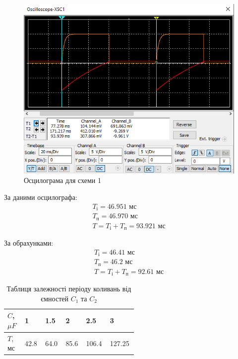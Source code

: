 \documentclass{article}
\begin{document}
\begin{normalsize}
	\begin{figure}[H]
		\centering
		\includegraphics[width=\textwidth]{2}
		\caption{Осцилограма для схеми 1}
	\end{figure}

	\begin{multicols}{2}
		За даними осцилографа:
		\begin{gather}
			T_{\text{і}}=46.951\text{ мс}\nonumber\\
			T_{\text{п}}=46.970\text{ мс}\nonumber\\
			T=T_{\text{і}}+T_{\text{п}}=93.921\text{ мс}\nonumber
		\end{gather}
		
		\columnbreak
		
		За обрахунками:
		\begin{gather}
			T_{\text{і}}=46.41\text{ мс}\nonumber\\
			T_{\text{п}}=46.2\text{ мс}\nonumber\\
			T=T_{\text{і}}+T_{\text{п}}=92.61\text{ мс}\nonumber
		\end{gather}
	\end{multicols}

	\begin{table}[H]
		\centering
		\renewcommand*\arraystretch{1.3}
		\begin{tabular}{|p{0.12\linewidth}|p{0.08\linewidth}|p{0.08\linewidth}|p{0.08\linewidth}|p{0.08\linewidth}|p{0.08\linewidth}|}
			\hline
			$C$, $\mu F$&1&1.5&2&2.5&3\\
			\hline
			$T$, мс&42.8&64.0&85.6&106.4&127.25\\
			\hline
		\end{tabular}
		\caption{Таблиця залежності періоду коливань від ємностей $C_1$ та $C_2$}
	\end{table}
	

\end{normalsize}
\end{document}
